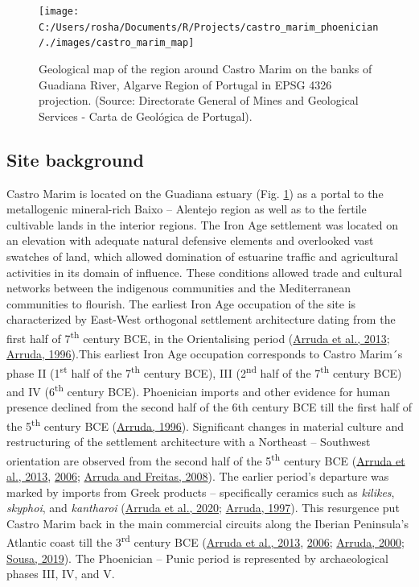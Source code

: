\documentclass[preprint, 3p, authoryear]{elsarticle} %
\begin{document}
\begin{figure}
\texttt{[image: C:/Users/rosha/Documents/R/Projects/castro\_marim\_phoenician/./images/castro\_marim\_map]} \caption{Geological map of the region around Castro Marim on the banks of Guadiana River, Algarve Region of Portugal in EPSG 4326 projection. (Source: Directorate General of Mines and Geological Services - Carta de Geológica de Portugal).}\label{fig:castro-marim-loc}
\end{figure}

\hypertarget{site-background}{%
\subsection{Site background}\label{site-background}}

Castro Marim is located on the Guadiana estuary (Fig. \ref{fig:castro-marim-loc}) as a portal to the metallogenic mineral-rich Baixo -- Alentejo region as well as to the fertile cultivable lands in the interior regions. The Iron Age settlement was located on an elevation with adequate natural defensive elements and overlooked vast swatches of land, which allowed domination of estuarine traffic and agricultural activities in its domain of influence. These conditions allowed trade and cultural networks between the indigenous communities and the Mediterranean communities to flourish. The earliest Iron Age occupation of the site is characterized by East-West orthogonal settlement architecture dating from the first half of 7\textsuperscript{th} century BCE, in the Orientalising period (\protect\hyperlink{ref-arruda_etal13}{Arruda et al., 2013}; \protect\hyperlink{ref-arruda96}{Arruda, 1996}).This earliest Iron Age occupation corresponds to Castro Marim´s phase II (1\textsuperscript{st} half of the 7\textsuperscript{th} century BCE), III (2\textsuperscript{nd} half of the 7\textsuperscript{th} century BCE) and IV (6\textsuperscript{th} century BCE). Phoenician imports and other evidence for human presence declined from the second half of the 6th century BCE till the first half of the 5\textsuperscript{th} century BCE (\protect\hyperlink{ref-arruda96}{Arruda, 1996}). Significant changes in material culture and restructuring of the settlement architecture with a Northeast -- Southwest orientation are observed from the second half of the 5\textsuperscript{th} century BCE (\protect\hyperlink{ref-arruda_etal13}{Arruda et al., 2013}, \protect\hyperlink{ref-arruda_etal06}{2006}; \protect\hyperlink{ref-arruda_freitas08}{Arruda and Freitas, 2008}). The earlier period's departure was marked by imports from Greek products -- specifically ceramics such as \emph{kilikes}, \emph{skyphoi}, and \emph{kantharoi} (\protect\hyperlink{ref-arruda_etal20}{Arruda et al., 2020}; \protect\hyperlink{ref-arruda97}{Arruda, 1997}). This resurgence put Castro Marim back in the main commercial circuits along the Iberian Peninsula's Atlantic coast till the 3\textsuperscript{rd} century BCE (\protect\hyperlink{ref-arruda_etal13}{Arruda et al., 2013}, \protect\hyperlink{ref-arruda_etal06}{2006}; \protect\hyperlink{ref-arruda00}{Arruda, 2000}; \protect\hyperlink{ref-sousa19}{Sousa, 2019}). The Phoenician -- Punic period is represented by archaeological phases III, IV, and V.
\end{document}
